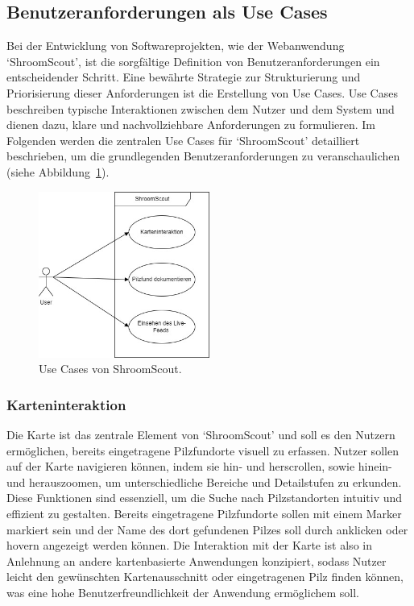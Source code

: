 \documentclass[../main.tex]{subfiles}
\begin{document}
\subsection{Benutzeranforderungen als Use Cases}

Bei der Entwicklung von Softwareprojekten, wie der Webanwendung `ShroomScout', ist die sorgfältige Definition von
Benutzeranforderungen ein entscheidender Schritt. Eine bewährte Strategie zur Strukturierung und Priorisierung dieser
Anforderungen ist die Erstellung von Use Cases. Use Cases beschreiben typische Interaktionen zwischen dem Nutzer und
dem System und dienen dazu, klare und nachvollziehbare Anforderungen zu formulieren. Im Folgenden werden die zentralen
Use Cases für `ShroomScout' detailliert beschrieben, um die grundlegenden Benutzeranforderungen zu veranschaulichen
(siehe Abbildung~\ref{fig:UseCase_Diagramm}).

\begin{figure}[ht]
	\centering
	\includegraphics[width=0.5\textwidth]{abbildungen/UseCaseDiagrammDrawio.jpg}
	\caption{Use Cases von ShroomScout.}
	\label{fig:UseCase_Diagramm}
\end{figure}

\subsubsection{Karteninteraktion}

Die Karte ist das zentrale Element von `ShroomScout' und soll es den Nutzern ermöglichen, bereits eingetragene Pilzfundorte
visuell zu erfassen. Nutzer sollen auf der Karte navigieren können, indem sie hin- und herscrollen, sowie hinein- und herauszoomen,
um unterschiedliche Bereiche und Detailstufen zu erkunden. Diese Funktionen sind essenziell, um die Suche nach Pilzstandorten
intuitiv und effizient zu gestalten. Bereits eingetragene Pilzfundorte sollen mit einem Marker markiert sein und der Name des
dort gefundenen Pilzes soll durch anklicken oder hovern angezeigt werden können. Die Interaktion mit der Karte ist also in
Anlehnung an andere kartenbasierte Anwendungen konzipiert, sodass Nutzer leicht den gewünschten Kartenausschnitt oder
eingetragenen Pilz finden können, was eine hohe Benutzerfreundlichkeit der Anwendung ermöglichem soll.
\end{document}
